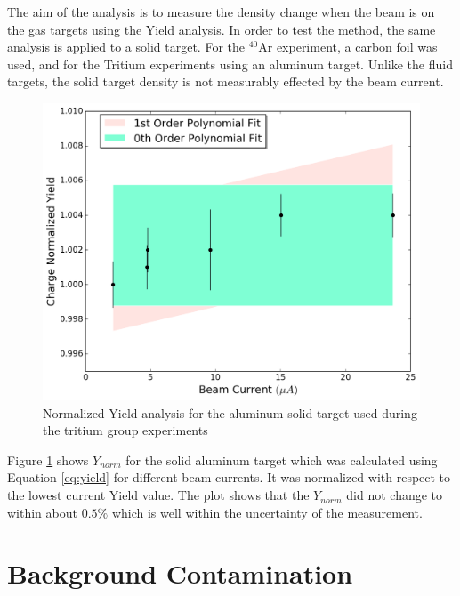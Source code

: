 \documentclass[final,5p,times,twocolumn]{elsarticle}
\begin{document}
The aim of the analysis is to measure the density change when the beam is on the gas targets using the Yield analysis. In order to test the method, the same analysis is applied to a solid target. For the $^{40}$Ar experiment, a carbon foil was used, and for the Tritium experiments using an aluminum target. Unlike the fluid targets, the solid target density is not measurably effected by the beam current.

\begin{figure}[htbp]
    \centering
    \includegraphics[width=\linewidth]{solid_target.pdf}
    \caption{Normalized Yield analysis for the aluminum solid target used during the tritium group experiments}
    \label{fig:solid}
\end{figure}

Figure \ref{fig:solid} shows $Y_{norm}$ for the solid aluminum target which was calculated using Equation \ref{eq:yield} for different beam currents. It was normalized with respect to the lowest current Yield value. The plot shows that the $Y_{norm}$ did not change to within about $0.5 \%$ which is well within the uncertainty of the measurement. 


\section{Background Contamination}
\end{document}
